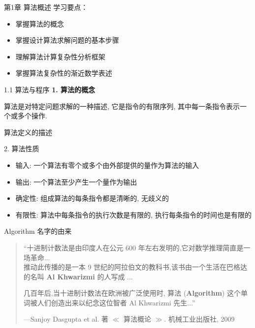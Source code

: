 \documentclass[fontset=fandol,UTF8,12pt,aspectratio=169,fleqn]{beamer}
\begin{document}

\begin{frame}{第1章  算法概述}
学习要点：
\begin{itemize}[<+-|alert@+>]
\item 掌握算法的概念
\item 掌握设计算法求解问题的基本步骤
\item 理解算法计算复杂性分析框架
\item 掌握算法复杂性的渐近数学表述
\end{itemize}
\end{frame}

\begin{frame}{1.1 算法与程序}
\textbf{1. 算法的概念}
\begin{definition}
算法是对特定问题求解的一种描述, 它是指令的有限序列, 其中每一条指令表示一个或多个操作.
\end{definition}
\end{frame}

\begin{frame}{算法定义的描述}
\begin{figure}
  \centering
  \label{fig:problem}
\end{figure}
\end{frame}

\begin{frame}{2. 算法性质}
\begin{itemize}[<+-|alert@+>]
\item 输入:  一个算法有零个或多个由外部提供的量作为算法的输入 
\item 输出:  一个算法至少产生一个量作为输出 
\item 确定性:  组成算法的每条指令都是清晰的, 无歧义的 
\item 有限性: 算法中每条指令的执行次数是有限的, 执行每条指令的时间也是有限的 
\end{itemize}
\end{frame}

\begin{frame}{\textsf{Algorithm} 名字的由来}
  \begin{quote}
  ``十进制计数法是由印度人在公元 600 年左右发明的,它对数学推理简直是一场革命$\ldots$ \\ 推动此传播的是一本 9 世纪的阿拉伯文的教科书,该书由一个生活在巴格达的名叫 \textbf{Al Khwarizmi} 的人写成 ...

几百年后,当十进制计数法在欧洲被广泛使用时, 算法 (\textbf{Algorithm}) 这个单词被人们创造出来以纪念这位智者 \textsf{Al Khwarizmi} 先生...''

---Sanjoy Dasgupta et al. 著 $\ll$ 算法概论 $\gg$. 机械工业出版社,
2009
\end{quote}
\end{frame}
\end{document}
